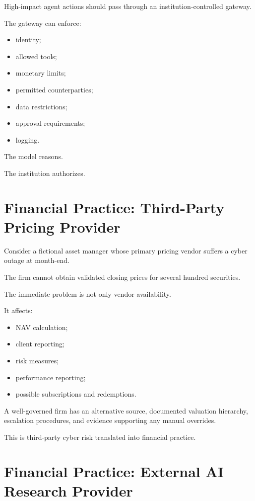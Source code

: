 High-impact agent actions should pass through an institution-controlled gateway.

The gateway can enforce:

\begin{itemize}
    \item identity;
    \item allowed tools;
    \item monetary limits;
    \item permitted counterparties;
    \item data restrictions;
    \item approval requirements;
    \item logging.
\end{itemize}

The model reasons.

The institution authorizes.

\section{Financial Practice: Third-Party Pricing Provider}

Consider a fictional asset manager whose primary pricing vendor suffers a cyber outage at month-end.

The firm cannot obtain validated closing prices for several hundred securities.

The immediate problem is not only vendor availability.

It affects:

\begin{itemize}
    \item NAV calculation;
    \item client reporting;
    \item risk measures;
    \item performance reporting;
    \item possible subscriptions and redemptions.
\end{itemize}

A well-governed firm has an alternative source, documented valuation hierarchy, escalation procedures, and evidence supporting any manual overrides.

This is third-party cyber risk translated into financial practice.

\section{Financial Practice: External AI Research Provider}

